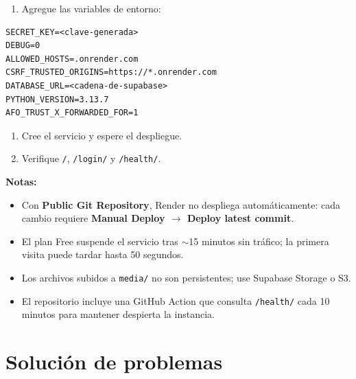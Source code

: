 \documentclass[11pt,a4paper]{article}
\newcommand{\campo}[1]{\texttt{\small #1}}
\begin{document}
\begin{enumerate}[leftmargin=1.4em,start=4]
  \item Agregue las variables de entorno:
\end{enumerate}

\begin{lstlisting}
SECRET_KEY=<clave-generada>
DEBUG=0
ALLOWED_HOSTS=.onrender.com
CSRF_TRUSTED_ORIGINS=https://*.onrender.com
DATABASE_URL=<cadena-de-supabase>
PYTHON_VERSION=3.13.7
AFO_TRUST_X_FORWARDED_FOR=1
\end{lstlisting}

\begin{enumerate}[leftmargin=1.4em,start=5]
  \item Cree el servicio y espere el despliegue.
  \item Verifique \campo{/}, \campo{/login/} y \campo{/health/}.
\end{enumerate}

\textbf{Notas:}
\begin{itemize}[leftmargin=1.4em]
  \item Con \textbf{Public Git Repository}, Render no despliega automáticamente:
        cada cambio requiere \textbf{Manual Deploy $\rightarrow$ Deploy latest commit}.
  \item El plan Free suspende el servicio tras $\sim$15 minutos sin tráfico; la
        primera visita puede tardar hasta 50 segundos.
  \item Los archivos subidos a \campo{media/} no son persistentes; use Supabase
        Storage o S3.
  \item El repositorio incluye una GitHub Action que consulta \campo{/health/}
        cada 10 minutos para mantener despierta la instancia.
\end{itemize}

\section{Solución de problemas}
\end{document}
